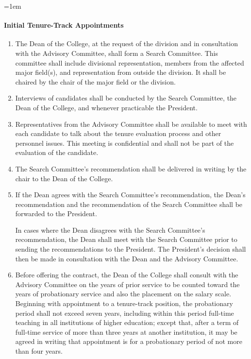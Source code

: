 \documentclass{manual}
\let\oldparagraph\paragraph
\renewcommand\paragraph{\leftskip=1em\oldparagraph}
\newcommand{\itemLevelA}{\alph*.}
\newcommand{\itemRefA}{\alph*}
\begin{document}
\paragraph{Initial Tenure-Track Appointments}\label{par:InitialTenureTrackAppointments}
\begin{enumerate}[label=\itemLevelA,ref=\itemRefA]


\item The Dean of the College, at the request of the division and in consultation with the Advisory Committee, shall form a Search Committee. This committee shall include divisional representation, members from the affected major field(s), and representation from outside the division. It shall be chaired by the chair of the major field or the division.


\item Interviews of candidates shall be conducted by the Search Committee, the Dean of the College, and whenever practicable the President.

\item Representatives from the Advisory Committee shall be available to meet with each candidate to talk about the tenure evaluation process and other personnel issues. This meeting is confidential and shall not be part of the evaluation of the candidate.


\item The Search Committee's recommendation shall be delivered in writing by the chair to the Dean of the College.


\item If the Dean agrees with the Search Committee's recommendation, the Dean's recommendation and the recommendation of the Search Committee shall be forwarded to the President.

In cases where the Dean disagrees with the Search Committee's recommendation, the Dean shall meet with the Search Committee prior to sending the recommendations to the President. The President's decision shall then be made in consultation with the Dean and the Advisory Committee.


\item Before offering the contract, the Dean of the College shall consult with the Advisory Committee on the years of prior service to be counted toward the years of probationary service and also the placement on the salary scale. Beginning with appointment to a tenure-track position, the probationary period shall not exceed seven years, including within this period full-time teaching in all institutions of higher education; except that, after a term of full-time service of more than three years at another institution, it may be agreed in writing that appointment is for a probationary period of not more than four years.



\end{enumerate}
\end{document}
